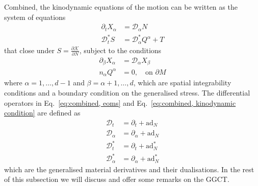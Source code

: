 Combined, the kinodynamic equations of the motion can be written as the system of equations
\begin{subequations} \label{eq:combined, eoms}
\begin{align}
\partial_t X_\alpha & = \mathcal{D}_\alpha N \label{eq:combined, eoms kinematic} \\
\mathcal{D}^*_t S & = \mathcal{D}^*_\alpha Q^\alpha + T
\end{align}
\end{subequations}
that close under $S = \frac{\partial \mathcal{K}}{\partial N}$, subject to the conditions
\begin{subequations} \label{eq:combined, kinodynamic condition}
	\begin{align}
		\partial_\beta X_\alpha & = \mathcal{D}_\alpha X_\beta \label{eq:combined, spatial integrability} \\
		n_\alpha Q^\alpha & = 0, \quad \text{on } \partial M \label{eq:combined, boundary conditions} 
	\end{align}
\end{subequations}
where $\alpha = 1, \dots, d-1$ and $\beta = \alpha+1, \dots, d$, which are spatial integrability conditions and a boundary condition on the generalised stress. The differential operators in Eq.~\ref{eq:combined, eoms} and Eq.~\ref{eq:combined, kinodynamic condition} are defined as
\begin{subequations} \label{eq:combined, generalised material derivatives}
	\begin{align}
		\mathcal{D}_t & = \partial_t + \text{ad}_N \\
		\mathcal{D}_\alpha & = \partial_\alpha + \text{ad}_N \\
		\mathcal{D}^*_t & = \partial_t + \text{ad}^*_N \\
		\mathcal{D}^*_\alpha & = \partial_\alpha + \text{ad}^*_N
	\end{align}
\end{subequations}
which are the generalised material derivatives and their dualisations. In the rest of this subsection we will discuss and offer some remarks on the GGCT.

